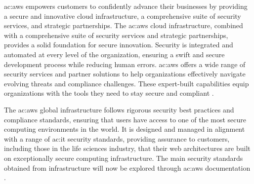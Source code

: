 \gls{ac:aws} empowers customers to confidently advance their businesses by providing a secure and innovative cloud infrastructure, a comprehensive suite of security services, and strategic partnerships. The \gls{ac:aws} cloud infrastructure, combined with a comprehensive suite of security services and strategic partnerships, provides a solid foundation for secure innovation. Security is integrated and automated at every level of the organization, ensuring a swift and secure development process while reducing human errors. \gls{ac:aws} offers a wide range of security services and partner solutions to help organizations effectively navigate evolving threats and compliance challenges. These expert-built capabilities equip organizations with the tools they need to stay secure and compliant \cite{AWSSecurity}.

The \gls{ac:aws} global infrastructure follows rigorous security best practices and compliance standards, ensuring that users have access to one of the most secure computing environments in the world. It is designed and managed in alignment with a range of \gls{ac:it} security standards, providing assurance to customers, including those in the life sciences industry, that their web architectures are built on exceptionally secure computing infrastructure. The main security standards obtained from infrastructure will now be explored through \gls{ac:aws} documentation \cite{AWSCertificationsAndAttestations}. 

